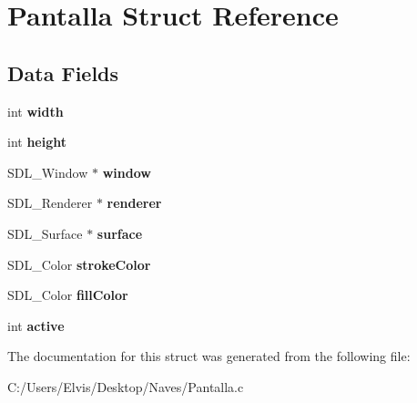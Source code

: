 \hypertarget{struct_pantalla}{}\section{Pantalla Struct Reference}
\label{struct_pantalla}
\subsection*{Data Fields}
\begin{DoxyCompactItemize}
\item 
int {\bfseries width}\hypertarget{struct_pantalla_a2474a5474cbff19523a51eb1de01cda4}{}\label{struct_pantalla_a2474a5474cbff19523a51eb1de01cda4}

\item 
int {\bfseries height}\hypertarget{struct_pantalla_ad12fc34ce789bce6c8a05d8a17138534}{}\label{struct_pantalla_ad12fc34ce789bce6c8a05d8a17138534}

\item 
S\+D\+L\+\_\+\+Window $\ast$ {\bfseries window}\hypertarget{struct_pantalla_aaa8e409e04dcf575ef63fd5fb3db06f9}{}\label{struct_pantalla_aaa8e409e04dcf575ef63fd5fb3db06f9}

\item 
S\+D\+L\+\_\+\+Renderer $\ast$ {\bfseries renderer}\hypertarget{struct_pantalla_a966da7a60c4ea3ba301e26ccc5efe452}{}\label{struct_pantalla_a966da7a60c4ea3ba301e26ccc5efe452}

\item 
S\+D\+L\+\_\+\+Surface $\ast$ {\bfseries surface}\hypertarget{struct_pantalla_a2f5cac12e913bcfcff660305bf88dd3b}{}\label{struct_pantalla_a2f5cac12e913bcfcff660305bf88dd3b}

\item 
S\+D\+L\+\_\+\+Color {\bfseries stroke\+Color}\hypertarget{struct_pantalla_a695e25e820714ff63dc741c0ecb10c81}{}\label{struct_pantalla_a695e25e820714ff63dc741c0ecb10c81}

\item 
S\+D\+L\+\_\+\+Color {\bfseries fill\+Color}\hypertarget{struct_pantalla_a53aea54ca42716a1ba6d2fa9cfb061ca}{}\label{struct_pantalla_a53aea54ca42716a1ba6d2fa9cfb061ca}

\item 
int {\bfseries active}\hypertarget{struct_pantalla_aa5805c5e936174e5092bf7a5b78e7e64}{}\label{struct_pantalla_aa5805c5e936174e5092bf7a5b78e7e64}

\end{DoxyCompactItemize}


The documentation for this struct was generated from the following file\+:\begin{DoxyCompactItemize}
\item 
C\+:/\+Users/\+Elvis/\+Desktop/\+Naves/Pantalla.\+c\end{DoxyCompactItemize}
